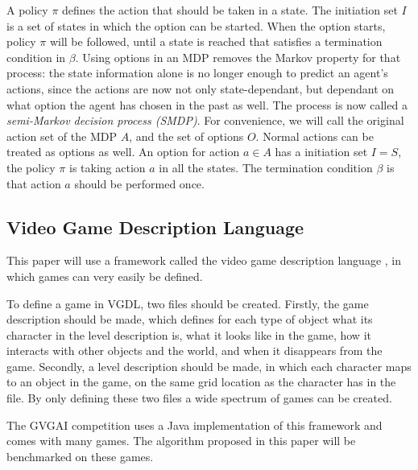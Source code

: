 A policy $\pi$ defines the action that should be taken in a state. The
initiation set $I$ is a set of states in which the option can be started. When the
option starts, policy $\pi$ will be followed, until a state is reached that
satisfies a termination condition in $\beta$. Using options in an MDP removes
the Markov property for that process: the state information alone is no longer
enough to predict an agent's actions, since the actions are now not only
state-dependant, but dependant on what option the agent has chosen in the past
as well. The process is now called a \emph{semi-Markov decision process
(SMDP)}. For convenience, we will call the original action set of the MDP $A$,
and the set of options $O$.  Normal actions can be treated as options as well.
An option for action $a \in A$ has a initiation set $I = S$, the policy $\pi$ is
taking action $a$ in all the states. The termination condition $\beta$ is that
action $a$ should be performed once.

\subsection{Video Game Description Language}
\label{subsec:vgdl}
This paper will use a framework called the video game description
language \cite{schaul2013video}, in which games can very easily be defined.

To define a game in VGDL, two files should be created. Firstly, the game
description should be made, which defines for each type of object what its
character in the level description is, what it looks like in the game, how it
interacts with other objects and the world, and when it disappears from the
game. Secondly, a level description should be made, in which each character maps
to an object in the game, on the same grid location as the character has in the
file. By only defining these two files a wide spectrum of games can be created.

The GVGAI competition uses a Java implementation of this framework and comes
with many games. The algorithm proposed in this paper will be benchmarked on
these games.
